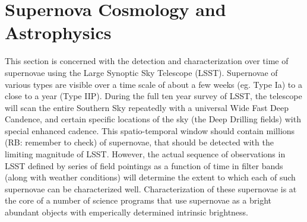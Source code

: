 %
%
%
%
%
%
%

\section{Supernova Cosmology and Astrophysics}
\label{sec:cosmology, supernovae, classification, lenstimedelays, deepdrillingfields } %




This section is concerned with the detection and characterization over time of 
supernovae using the Large Synoptic Sky Telescope (LSST). Supernovae of various 
types are visible over a time scale of about a few weeks (eg. Type Ia) to a
 close to a year (Type IIP). During the full ten year survey of LSST, the 
telescope will scan the entire Southern Sky repeatedly with a universal Wide Fast Deep
 Candence, and certain specific locations of the sky (the Deep Drilling fields)  
with special enhanced cadence. This spatio-temporal window should contain 
millions (RB: remember to check) of supernovae, that should be detected with the
 limiting magnitude of LSST. However, the actual sequence of observations in LSST 
defined by series of field pointings as a function of time in filter bands
 (along with weather conditions) will determine the extent to which each of such 
supernovae can be characterized well. Characterization of these supernovae is at
 the core of a number of science programs that use supernovae as a bright abundant
 objects with emperically determined intrinsic brightness. 

